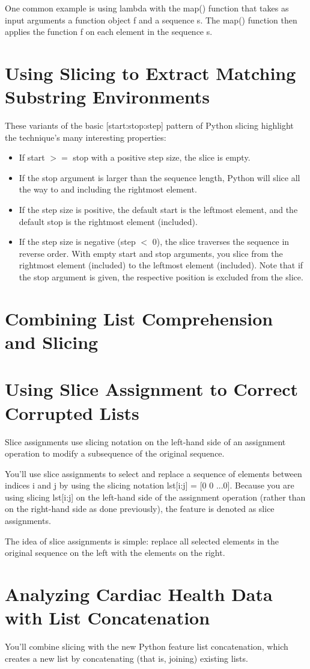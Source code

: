 One common example is using lambda with the map() function that takes as input arguments a function object f and a sequence s. The map() function then applies the function f on each element in the sequence s.
\section{Using Slicing to Extract Matching Substring Environments}

These variants of the basic \textsf{[start:stop:step]} pattern of Python slicing
highlight the technique’s many interesting properties:
\begin{itemize}
    \item If start $>=$ stop with a positive step size, the slice is empty.
    \item If the stop argument is larger than the sequence length, Python will slice all the way to and including the rightmost element.
    \item If the step size is positive, the default start is the leftmost element, and the default stop is the rightmost element (included).
    \item If the step size is negative (step $<$ 0), the slice traverses the sequence in reverse order. With empty start and stop arguments, you slice from the rightmost element (included) to the leftmost element (included). Note that if the stop argument is given, the respective position is excluded from the slice.
\end{itemize}

\section{Combining List Comprehension and Slicing}

\section{Using Slice Assignment to Correct Corrupted Lists}
Slice assignments use slicing notation on the left-hand side of an assignment operation to modify a subsequence of the original sequence.

You’ll use slice assignments to select and replace a sequence of elements between indices i and j by using the slicing notation lst[i:j] = [0 0 ...0]. Because you are using slicing lst[i:j] on the left-hand side of the assignment operation (rather than on the right-hand side as done previously), the feature is denoted as slice assignments.

The idea of slice assignments is simple: replace all selected elements in
the original sequence on the left with the elements on the right.

\section{Analyzing Cardiac Health Data with List Concatenation}
You’ll combine slicing with the new Python feature list concatenation, which creates a new list by concatenating (that is, joining) existing lists.